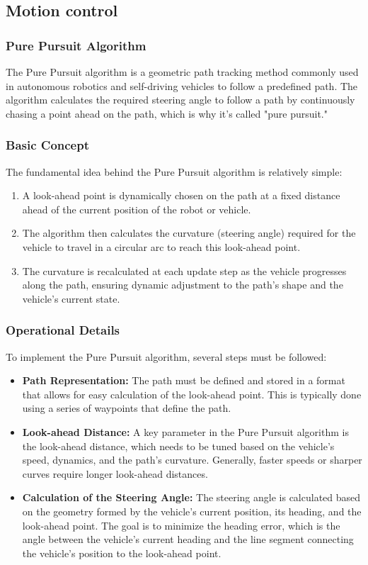 \documentclass{article}
\begin{document}
	\subsection{Motion control}
	\subsubsection{Pure Pursuit Algorithm}
	The Pure Pursuit algorithm is a geometric path tracking method commonly used in autonomous robotics and self-driving vehicles to follow a predefined path. The algorithm calculates the required steering angle to follow a path by continuously chasing a point ahead on the path, which is why it's called "pure pursuit."
	
	\subsubsection*{Basic Concept}
	The fundamental idea behind the Pure Pursuit algorithm is relatively simple:
	\begin{enumerate}
		\item A look-ahead point is dynamically chosen on the path at a fixed distance ahead of the current position of the robot or vehicle.
		\item The algorithm then calculates the curvature (steering angle) required for the vehicle to travel in a circular arc to reach this look-ahead point.
		\item The curvature is recalculated at each update step as the vehicle progresses along the path, ensuring dynamic adjustment to the path's shape and the vehicle's current state.
	\end{enumerate}
	
	\subsubsection*{Operational Details}
	To implement the Pure Pursuit algorithm, several steps must be followed:
	\begin{itemize}
		\item \textbf{Path Representation:} The path must be defined and stored in a format that allows for easy calculation of the look-ahead point. This is typically done using a series of waypoints that define the path.
		\item \textbf{Look-ahead Distance:} A key parameter in the Pure Pursuit algorithm is the look-ahead distance, which needs to be tuned based on the vehicle's speed, dynamics, and the path's curvature. Generally, faster speeds or sharper curves require longer look-ahead distances.
		\item \textbf{Calculation of the Steering Angle:} The steering angle is calculated based on the geometry formed by the vehicle's current position, its heading, and the look-ahead point. The goal is to minimize the heading error, which is the angle between the vehicle's current heading and the line segment connecting the vehicle's position to the look-ahead point.
	\end{itemize}
	
\end{document}
